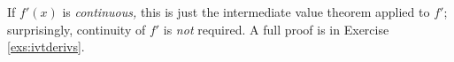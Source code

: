 If $f'(x)$ is \emph{continuous,} this is just the intermediate value theorem applied to $f'$; surprisingly, continuity of $f'$ is \emph{not} required. A full proof is in Exercise \ref{exs:ivtderivs}.

\goodbreak






% 


